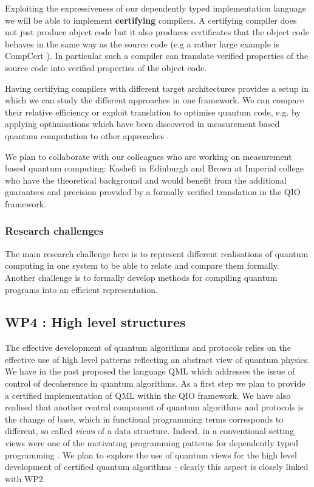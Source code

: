 \documentclass[a4paper]{article}
\begin{document}
Exploiting the expressiveness of our dependently typed implementation
language we will be able to implement \textbf{certifying} compilers.
A certifying compiler does not just produce object code but it also
produces certificates that the object code behaves in the same way as
the source code (e.g a rather large example is CompCert
). In particular such a compiler can translate verified
properties of the source code into verified properties of the object
code. 

Having certifying compilers with different target architectures
provides a setup in which we can study the different approaches in one
framework. We can compare their relative efficiency or exploit
translation to optimise quantum code, e.g. by applying optimisations
which have been discovered in measurement based quantum computation to
other approaches .

We plan to collaborate with our colleagues who are working on
measurement based quantum computing: Kashefi in Edinburgh and
Brown at Imperial college who have the theoretical background and
would benefit from the additional guarantees and precision provided
by a formally verified translation in the QIO framework.

\subsubsection*{Research challenges}

The main research challenge here is to represent different realisations
of quantum computing in one system to be able to relate and compare
them formally. Another challenge is to formally develop methods
for compiling quantum programs into an efficient representation.

\subsection*{WP4 : High level structures}
\label{sec:wp4}

The effective development of quantum algorithms and protocols relies
on the effective use of high level patterns reflecting an abstract
view of quantum physics. We have in the past proposed the language QML
which addresses the issue of control of decoherence in quantum
algorithms. As a first step we plan to provide a certified
implementation of QML within the QIO framework. We have also realised
that another central component of quantum algorithms and protocols is
the change of base, which in functional programming terms corresponds
to different, so called \emph{views} of a data structure. Indeed, in a
conventional setting views were one of the motivating programming
patterns for dependently typed programming . We plan to
explore the use of quantum views for the high level development of
certified quantum algorithms - clearly this aspect is closely linked
with WP2. 
\end{document}
